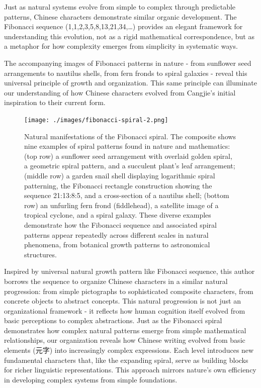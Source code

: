 \documentclass[11pt,letterpaper]{article}
\begin{document}
Just as natural systems evolve from simple to complex through
predictable patterns, Chinese characters demonstrate similar organic
development. The Fibonacci sequence (1,1,2,3,5,8,13,21,34,\ldots)
provides an elegant framework for understanding this evolution, not as a
rigid mathematical correspondence, but as a metaphor for how complexity
emerges from simplicity in systematic ways.

The accompanying images of Fibonacci patterns in nature - from sunflower
seed arrangements to nautilus shells, from fern fronds to spiral
galaxies - reveal this universal principle of growth and organization.
This same principle can illuminate our understanding of how Chinese
characters evolved from Cangjie's initial inspiration to their current
form.

\begin{figure}
\centering
\texttt{[image: ./images/fibonacci-spiral-2.png]}
\caption{Natural manifestations of the Fibonacci spiral. The composite
shows nine examples of spiral patterns found in nature and mathematics:
(top row) a sunflower seed arrangement with overlaid golden spiral, a
geometric spiral pattern, and a succulent plant's leaf arrangement;
(middle row) a garden snail shell displaying logarithmic spiral
patterning, the Fibonacci rectangle construction showing the sequence
21:13:8:5, and a cross-section of a nautilus shell; (bottom row) an
unfurling fern frond (fiddlehead), a satellite image of a tropical
cyclone, and a spiral galaxy. These diverse examples demonstrate how the
Fibonacci sequence and associated spiral patterns appear repeatedly
across different scales in natural phenomena, from botanical growth
patterns to astronomical structures.}
\end{figure}

Inspired by universal natural growth pattern like Fibonacci sequence,
this author borrows the sequence to organize Chinese characters in a
similar natural progression: from simple pictographs to sophisticated
composite characters, from concrete objects to abstract concepts. This
natural progression is not just an organizational framework - it
reflects how human cognition itself evolved from basic perceptions to
complex abstractions. Just as the Fibonacci spiral demonstrates how
complex natural patterns emerge from simple mathematical relationships,
our organization reveals how Chinese writing evolved from basic elements
(元字) into increasingly complex expressions. Each level introduces new
fundamental characters that, like the expanding spiral, serve as
building blocks for richer linguistic representations. This approach
mirrors nature's own efficiency in developing complex systems from
simple foundations.
\end{document}
